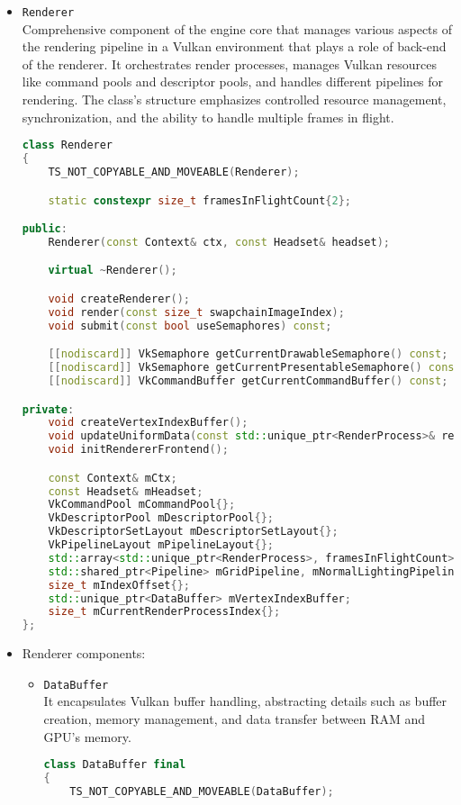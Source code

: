 \begin{itemize}
    \item \texttt{Renderer}\\
    Comprehensive component of the engine core that manages various aspects of the rendering pipeline in a Vulkan environment that plays a role of back-end of the renderer. It orchestrates render processes, manages Vulkan resources like command pools and descriptor pools, and handles different pipelines for rendering. The class's structure emphasizes controlled resource management, synchronization, and the ability to handle multiple frames in flight.
\begin{lstlisting}[language=c++, caption=\texttt{Renderer} class (./engine/src/core/renderer.h)]
class Renderer
{
    TS_NOT_COPYABLE_AND_MOVEABLE(Renderer);

    static constexpr size_t framesInFlightCount{2};

public:
    Renderer(const Context& ctx, const Headset& headset);

    virtual ~Renderer();

    void createRenderer();
    void render(const size_t swapchainImageIndex);
    void submit(const bool useSemaphores) const;

    [[nodiscard]] VkSemaphore getCurrentDrawableSemaphore() const;
    [[nodiscard]] VkSemaphore getCurrentPresentableSemaphore() const;
    [[nodiscard]] VkCommandBuffer getCurrentCommandBuffer() const;

private:
    void createVertexIndexBuffer();
    void updateUniformData(const std::unique_ptr<RenderProcess>& renderProcess);
    void initRendererFrontend();

    const Context& mCtx;
    const Headset& mHeadset;
    VkCommandPool mCommandPool{};
    VkDescriptorPool mDescriptorPool{};
    VkDescriptorSetLayout mDescriptorSetLayout{};
    VkPipelineLayout mPipelineLayout{};
    std::array<std::unique_ptr<RenderProcess>, framesInFlightCount> mRenderProcesses{};
    std::shared_ptr<Pipeline> mGridPipeline, mNormalLightingPipeline, mPbrPipeline, mLightCubePipeline;
    size_t mIndexOffset{};
    std::unique_ptr<DataBuffer> mVertexIndexBuffer;
    size_t mCurrentRenderProcessIndex{};
};
\end{lstlisting}
    \item Renderer components:
    \begin{itemize}
    \item \texttt{DataBuffer}\\
    It encapsulates Vulkan buffer handling, abstracting details such as buffer creation, memory management, and data transfer between RAM and GPU's memory.
\begin{lstlisting}[language=c++, caption=\texttt{DataBuffer} class (./engine/src/core/data\_buffer.h)]
class DataBuffer final
{
    TS_NOT_COPYABLE_AND_MOVEABLE(DataBuffer);


\end{lstlisting}
\end{itemize}
\end{itemize}
